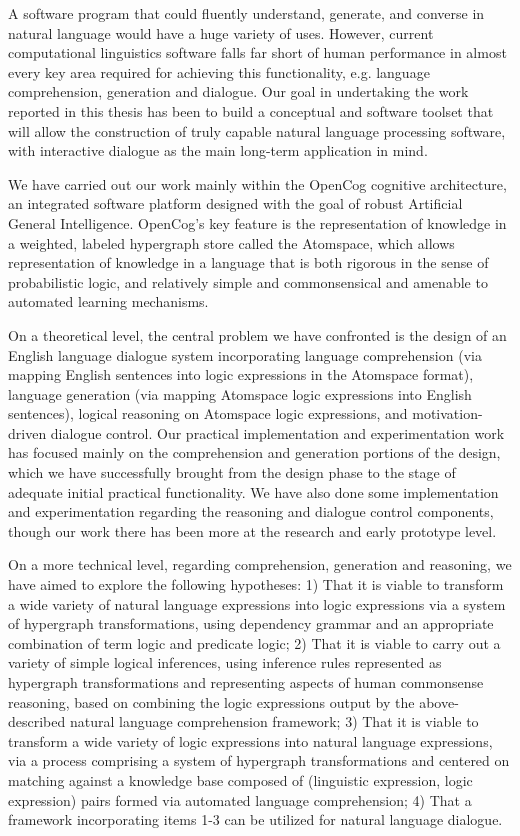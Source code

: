 \begin{englishabstract}
    A software program that could fluently understand, generate, and converse in natural language would have a huge variety of uses.   However, current  computational linguistics software falls far short of human performance in almost every key area required for achieving this functionality, e.g. language comprehension, generation and dialogue.   Our goal in undertaking the work reported in this thesis has been to build a conceptual and software toolset that will allow the construction of truly capable natural language processing software, with interactive dialogue as the main long-term application in mind.

We have carried out our work mainly within the OpenCog cognitive architecture, an integrated software platform designed with the goal of robust Artificial General Intelligence.   OpenCog's key feature is the representation of knowledge in a weighted, labeled hypergraph store called the Atomspace, which allows representation of knowledge in a language that is both rigorous in the sense of probabilistic logic, and relatively simple and commonsensical and amenable to automated learning mechanisms.   

On a theoretical level, the central problem we have confronted is the design of an English language dialogue system incorporating language comprehension (via mapping English sentences into logic expressions in the Atomspace format), language generation (via mapping Atomspace logic expressions into English sentences), logical reasoning on Atomspace logic expressions, and motivation-driven dialogue control.    Our practical implementation and experimentation work has focused mainly on the comprehension and generation portions of the design, which we have successfully brought from the design phase to the stage of adequate initial practical functionality.  We have also done some implementation and experimentation regarding the reasoning and dialogue control components, though our work there has been more at the research and early prototype level.

On a more technical level, regarding comprehension, generation and reasoning, we have aimed to explore the following hypotheses: 1) That it is viable to transform a wide variety of natural language expressions into logic expressions via a system of hypergraph transformations, using dependency grammar and an appropriate combination of term logic and predicate logic; 2) That it is viable to carry out a variety of simple logical inferences, using inference rules represented as hypergraph transformations and representing aspects of human commonsense reasoning, based on combining the logic expressions output by the above-described natural language comprehension framework; 3) That it is viable to transform a wide variety of logic expressions into natural language expressions, via a process comprising a system of hypergraph transformations and centered on matching against a knowledge base composed of (linguistic expression, logic expression) pairs formed via automated language comprehension; 4) That a framework incorporating items 1-3 can be utilized for natural language dialogue.


\end{englishabstract}
